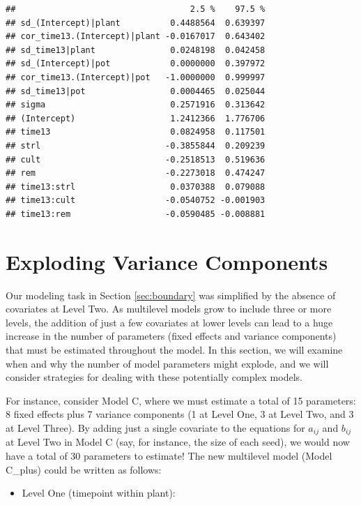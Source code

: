 \documentclass[
]{krantz}
\providecommand{\tightlist}{%
  \setlength{\itemsep}{0pt}\setlength{\parskip}{0pt}}
\begin{document}
\begin{verbatim}
##                                   2.5 %    97.5 %
## sd_(Intercept)|plant          0.4488564  0.639397
## cor_time13.(Intercept)|plant -0.0167017  0.643402
## sd_time13|plant               0.0248198  0.042458
## sd_(Intercept)|pot            0.0000000  0.397972
## cor_time13.(Intercept)|pot   -1.0000000  0.999997
## sd_time13|pot                 0.0004465  0.025044
## sigma                         0.2571916  0.313642
## (Intercept)                   1.2412366  1.776706
## time13                        0.0824958  0.117501
## strl                         -0.3855844  0.209239
## cult                         -0.2518513  0.519636
## rem                          -0.2273018  0.474247
## time13:strl                   0.0370388  0.079088
## time13:cult                  -0.0540752 -0.001903
## time13:rem                   -0.0590485 -0.008881
\end{verbatim}

\section{Exploding Variance Components}\label{sec:explodingvarcomps}

Our modeling task in Section \ref{sec:boundary} was simplified by the absence of covariates at Level Two. As multilevel models grow to include three or more levels, the addition of just a few covariates at lower levels can lead to a huge increase in the number of parameters (fixed effects and variance components)  that must be estimated throughout the model. In this section, we will examine when and why the number of model parameters might explode, and we will consider strategies for dealing with these potentially complex models.

For instance, consider Model C, where we must estimate a total of 15 parameters: 8 fixed effects plus 7 variance components (1 at Level One, 3 at Level Two, and 3 at Level Three). By adding just a single covariate to the equations for \(a_{ij}\) and \(b_{ij}\) at Level Two in Model C (say, for instance, the size of each seed), we would now have a total of 30 parameters to estimate! The new multilevel model (Model C\_plus) could be written as follows:

\begin{itemize}
\tightlist
\item
  Level One (timepoint within plant):
\end{itemize}
\end{document}
